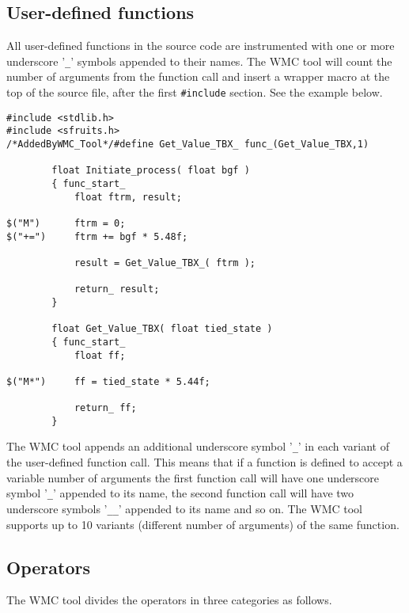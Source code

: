 \subsection{User-defined functions}

All user-defined functions in the source code are instrumented with one or more underscore '\verb|_|' symbols appended to their names. The WMC tool will count the number of arguments from the function call and insert a wrapper macro at the top of the source file, after the first \verb|#include| section. See the example below.

\begin{Verbatim}[fontsize=\small]
#include <stdlib.h>
#include <sfruits.h>
/*AddedByWMC_Tool*/#define Get_Value_TBX_ func_(Get_Value_TBX,1)

        float Initiate_process( float bgf )
        { func_start_
            float ftrm, result;

$("M")      ftrm = 0;
$("+=")     ftrm += bgf * 5.48f;

            result = Get_Value_TBX_( ftrm );

            return_ result;
        }
        
        float Get_Value_TBX( float tied_state )
        { func_start_
            float ff;

$("M*")     ff = tied_state * 5.44f;

            return_ ff;
        }
\end{Verbatim}

The WMC tool appends an additional underscore symbol '\verb|_|' in each variant of the user-defined function call. This means that if a function is defined to accept a variable number of arguments the first function call will have one underscore symbol '\verb|_|' appended to its name, the second function call will have two underscore symbols '\verb|__|' appended to its name and so on. The WMC tool supports up to 10 variants (different number of arguments) of the same function.

\subsection{Operators}

The WMC tool divides the operators in three categories as follows.

